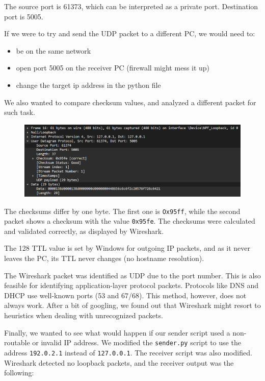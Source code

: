 The source port is 61373, which can be interpreted as a private port.
Destination port is 5005.

If we were to try and send the UDP packet to a different PC, we would need to:

\begin{itemize}
	\item be on the same network
	\item open port 5005 on the receiver PC (firewall might mess it up)
	\item change the target ip address in the python file
\end{itemize}

We also wanted to compare checksum values, and analyzed a different packet for
such task.

\begin{figure}[htbp]
	\centering
	\includegraphics[width=1\linewidth]{img/second_exp/4.png}
	\caption{}\label{fig:2_4}
\end{figure}

The checksums differ by one byte. The first one is \texttt{Ox95ff}, while the
second packet shows a checksum with the value \texttt{0x95fe}. The checksums
were calculated and validated correctly, as displayed by Wireshark.

The 128 TTL value is set by Windows for outgoing IP packets, and as it never
leaves the PC, its TTL never changes (no hostname resolution).

The Wireshark packet was identified as UDP due to the port number. This is also
feasible for identifying application-layer protocol packets. Protocols like DNS
and DHCP use well-known ports (53 and 67/68). This method, however, does not
always work. After a bit of googling, we found out that Wireshark might resort
to heuristics when dealing with unrecognized packets.

Finally, we wanted to see what would happen if our sender script used a
non-routable or invalid IP address. We modified the \texttt{sender.py} script
to use the address \texttt{192.0.2.1} instead of \texttt{127.0.0.1}. The
receiver script was also modified. Wireshark detected no loopback packets, and
the receiver output was the following:

